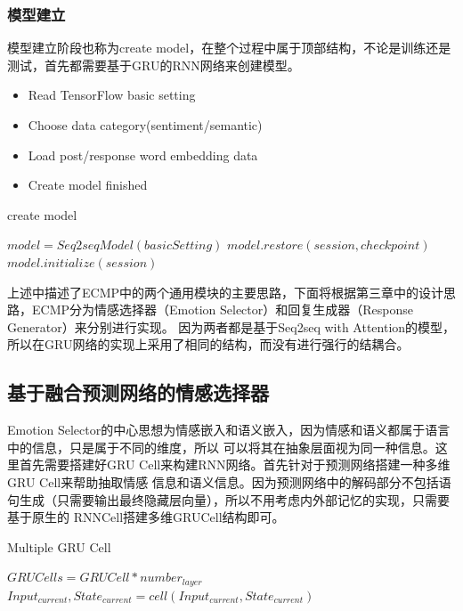 \documentclass[supercite]{HustGraduPaper}
\theoremstyle{definition}
\begin{document}
\subsubsection{模型建立}
模型建立阶段也称为create model，在整个过程中属于顶部结构，不论是训练还是测试，首先都需要基于GRU的RNN网络来创建模型。
\begin{itemize}
  \item Read TensorFlow basic setting
  \item Choose data category(sentiment/semantic)
  \item Load post/response word embedding data
  \item Create model finished
\end{itemize}
\begin{algorithm}
  \caption{create model}
  \label{alg:crm}
  \begin{algorithmic}
    \State $model = Seq2seqModel(basic Setting)$
      \State $model.restore(session,checkpoint)$
    \Else \State $model.initialize(session)$
    \EndIf
  \end{algorithmic}
\end{algorithm}


上述中描述了ECMP中的两个通用模块的主要思路，下面将根据第三章中的设计思路，ECMP分为情感选择器（Emotion Selector）和回复生成器（Response Generator）来分别进行实现。
因为两者都是基于Seq2seq with Attention的模型，所以在GRU网络的实现上采用了相同的结构，而没有进行强行的结耦合。

\subsection{基于融合预测网络的情感选择器}
Emotion Selector的中心思想为情感嵌入和语义嵌入，因为情感和语义都属于语言中的信息，只是属于不同的维度，所以
可以将其在抽象层面视为同一种信息。这里首先需要搭建好GRU Cell来构建RNN网络。首先针对于预测网络搭建一种多维GRU Cell来帮助抽取情感
信息和语义信息。因为预测网络中的解码部分不包括语句生成（只需要输出最终隐藏层向量），所以不用考虑内外部记忆的实现，只需要基于原生的
RNNCell搭建多维GRUCell结构即可。

\begin{algorithm}
  \caption{Multiple GRU Cell}
  \label{alg:mtgc}
  \begin{algorithmic}
    \State $GRUCells = GRUCell * number_{layer}$
      \State $Input_{current}, State_{current} = cell(Input_{current}, State_{current})$
    \EndFor
  \end{algorithmic}
\end{algorithm}
\end{document}
